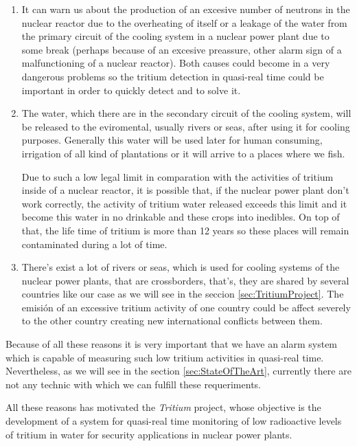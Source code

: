 \begin{enumerate}

\item{} It can warn us about the production of an excesive number of neutrons in the nuclear reactor due to the overheating of itself or a leakage of the water from the primary circuit of the cooling system in a nuclear power plant due to some break (perhaps because of an excesive preassure, other alarm sign of a malfunctioning of a nuclear reactor). Both causes could become in a very dangerous problems so the tritium detection in quasi-real time could be important in order to quickly detect and to solve it.

\item{} The water, which there are in the secondary circuit of the cooling system, will be released to the eviromental, usually rivers or seas, after using it for cooling purposes. Generally this water will be used later for human consuming, irrigation of all kind of plantations or it will arrive to a places where we fish. 

Due to such a low legal limit in comparation with the activities of tritium inside of a nuclear reactor, it is possible that, if the nuclear power plant don't work correctly, the activity of tritium water released exceeds this limit and it become this water in no drinkable and these crops into inedibles. On top of that, the life time of tritium is more than 12 years so these places will remain contaminated during a lot of time. 

\item{} There's exist a lot of rivers or seas, which is used for cooling systems of the nuclear power plants, that are crossborders, that's, they are shared by several countries like our case as we will see in the seccion \ref{sec:TritiumProject}. The emisión of an excessive tritium activity of one country could be affect severely to the other country creating new international conflicts between them.

\end{enumerate}

Because of all these reasons it is very important that we have an alarm system which is capable of measuring such low tritium activities in quasi-real time. Nevertheless, as we will see in the section \ref{sec:StateOfTheArt}, currently there are not any technic with which we can fulfill these requeriments.

All these reasons has motivated the \textit{Tritium} project, whose objective is the development of a system for quasi-real time monitoring of low radioactive levels of tritium in water for security applications in nuclear power plants.
